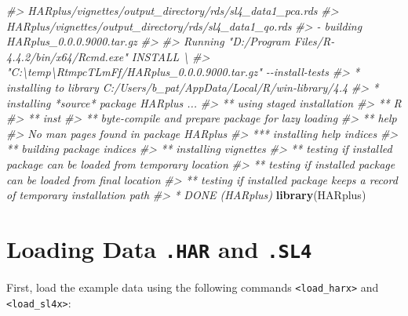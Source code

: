 \documentclass[
]{article}
\newenvironment{Shaded}{\begin{snugshade}}{\end{snugshade}}
\newcommand{\CommentTok}[1]{\textcolor[rgb]{0.56,0.35,0.01}{\textit{#1}}}
\newcommand{\FunctionTok}[1]{\textcolor[rgb]{0.13,0.29,0.53}{\textbf{#1}}}
\newcommand{\NormalTok}[1]{#1}
\begin{document}
\begin{Shaded}
\begin{Highlighting}[]
\CommentTok{\#\textgreater{}        \textquotesingle{}HARplus/vignettes/output\_directory/rds/sl4\_data1\_pca.rds\textquotesingle{}}
\CommentTok{\#\textgreater{}        \textquotesingle{}HARplus/vignettes/output\_directory/rds/sl4\_data1\_qo.rds\textquotesingle{}}
\CommentTok{\#\textgreater{}   {-}  building \textquotesingle{}HARplus\_0.0.0.9000.tar.gz\textquotesingle{}}
\CommentTok{\#\textgreater{}      }
\CommentTok{\#\textgreater{} Running "D:/Program Files/R{-}4.4.2/bin/x64/Rcmd.exe" INSTALL \textbackslash{}}
\CommentTok{\#\textgreater{}   "C:\textbackslash{}temp\textbackslash{}RtmpcTLmFf/HARplus\_0.0.0.9000.tar.gz" {-}{-}install{-}tests }
\CommentTok{\#\textgreater{} * installing to library \textquotesingle{}C:/Users/b\_pat/AppData/Local/R/win{-}library/4.4\textquotesingle{}}
\CommentTok{\#\textgreater{} * installing *source* package \textquotesingle{}HARplus\textquotesingle{} ...}
\CommentTok{\#\textgreater{} ** using staged installation}
\CommentTok{\#\textgreater{} ** R}
\CommentTok{\#\textgreater{} ** inst}
\CommentTok{\#\textgreater{} ** byte{-}compile and prepare package for lazy loading}
\CommentTok{\#\textgreater{} ** help}
\CommentTok{\#\textgreater{} No man pages found in package  \textquotesingle{}HARplus\textquotesingle{} }
\CommentTok{\#\textgreater{} *** installing help indices}
\CommentTok{\#\textgreater{} ** building package indices}
\CommentTok{\#\textgreater{} ** installing vignettes}
\CommentTok{\#\textgreater{} ** testing if installed package can be loaded from temporary location}
\CommentTok{\#\textgreater{} ** testing if installed package can be loaded from final location}
\CommentTok{\#\textgreater{} ** testing if installed package keeps a record of temporary installation path}
\CommentTok{\#\textgreater{} * DONE (HARplus)}
\FunctionTok{library}\NormalTok{(HARplus)}
\end{Highlighting}
\end{Shaded}

\section{\texorpdfstring{Loading Data \texttt{.HAR} and
\texttt{.SL4}}{Loading Data .HAR and .SL4}}\label{loading-data-.har-and-.sl4}

First, load the example data using the following commands
\texttt{\textless{}load\_harx\textgreater{}} and
\texttt{\textless{}load\_sl4x\textgreater{}}:
\end{document}
